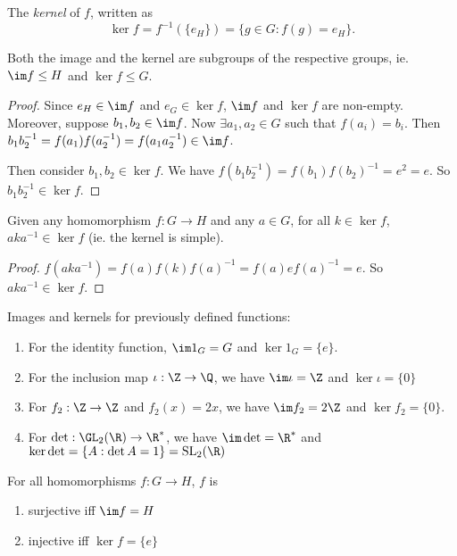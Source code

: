 \documentclass[a4paper]{article}
\begin{document}
\begin{defi}
  The \emph{kernel} of $f$, written as
  \[
    \ker f = f^{-1}(\{e_H\}) = \{g\in G:f(g)=e_H\}.
  \]
\end{defi}

\begin{prop}
  Both the image and the kernel are subgroups of the respective groups, ie. $\im f\leq H$ and $\ker f \leq G$.
\end{prop}

\begin{proof}
  Since $e_H\in \im f$ and $e_G\in \ker f$, $\im f$ and $\ker f$ are non-empty. Moreover, suppose $b_1, b_2\in \im f$. Now $\exists a_1, a_2 \in G$ such that $f(a_i) = b_i$. Then $b_1b_2^{-1} = f(a_1)f(a_2^{-1}) = f(a_1a_2^{-1})\in \im f$.

  Then consider $b_1,b_2\in \ker f$. We have $f(b_1b_2^{-1}) = f(b_1)f(b_2)^{-1} = e^2 = e$. So $b_1b_2^{-1}\in \ker f$.
\end{proof}

\begin{prop}
  Given any homomorphism $f:G\rightarrow H$ and any $a\in G$, for all $k\in \ker f$, $aka^{-1}\in\ker f$ (ie. the kernel is simple).
\end{prop}

\begin{proof}
  $f(aka^{-1}) = f(a)f(k)f(a)^{-1} = f(a)ef(a)^{-1} = e$. So $aka^{-1}\in \ker f$.
\end{proof}

\begin{eg}
  Images and kernels for previously defined functions:
  \begin{enumerate}
    \item For the identity function, $\im 1_G = G$ and $\ker 1_G = \{e\}$.
    \item For the inclusion map $\iota: \Z\rightarrow\Q$, we have $\im \iota = \Z$ and $\ker \iota = \{0\}$
    \item For $f_2:\Z\rightarrow\Z$ and $f_2(x) = 2x$, we have $\im f_2 = 2\Z$ and $\ker f_2 = \{0\}$.
    \item For $\det: \GL_2(\R) \rightarrow \R^*$, we have $\im \det = \R^*$ and $\ker \det = \{A:\det A = 1\} = \mathrm{SL}_2(\R)$
  \end{enumerate}
\end{eg}
\begin{prop}
  For all homomorphisms $f:G\rightarrow H$, $f$ is
  \begin{enumerate}
    \item surjective iff $\im f = H$
    \item injective iff $\ker f = \{e\}$
  \end{enumerate}
\end{prop}
\end{document}
